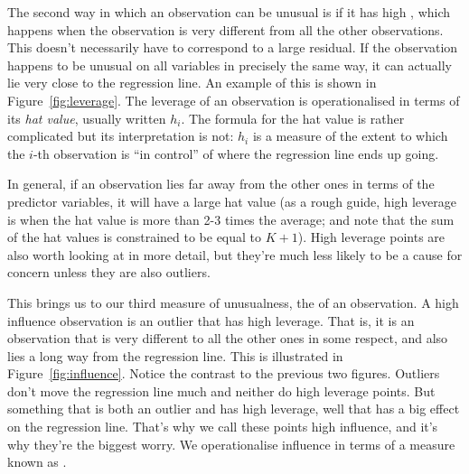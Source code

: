 The second way in which an observation can be unusual is if it has high , which happens when the observation is very different from all the other observations. This doesn't necessarily have to correspond to a large residual. If the observation happens to be unusual on all variables in precisely the same way, it can actually lie very close to the regression line. An example of this is shown in Figure~\ref{fig:leverage}. The leverage of an observation is operationalised in terms of its {\it hat value}, usually written $h_i$. The formula for the hat value is rather complicated but its interpretation is not: $h_i$ is a measure of the extent to which the $i$-th observation is ``in control'' of where the regression line ends up going. 

In general, if an observation lies far away from the other ones in terms of the predictor variables, it will have a large hat value (as a rough guide, high leverage is when the hat value is more than 2-3 times the average; and note that the sum of the hat values is constrained to be equal to $K+1$). High leverage points are also worth looking at in more detail, but they're much less likely to be a cause for concern unless they are also outliers.  %

This brings us to our third measure of unusualness, the  of an observation. A high influence observation is an outlier that has high leverage. That is, it is an observation that is very different to all the other ones in some respect, and also lies a long way from the regression line. This is illustrated in Figure~\ref{fig:influence}. Notice the contrast to the previous two figures. Outliers don't move the regression line much and neither do high leverage points. But something that is both an outlier and has high leverage, well that has a big effect on the regression line. That's why we call these points high influence, and it's why they're the biggest worry. We operationalise influence in terms of a measure known as .

